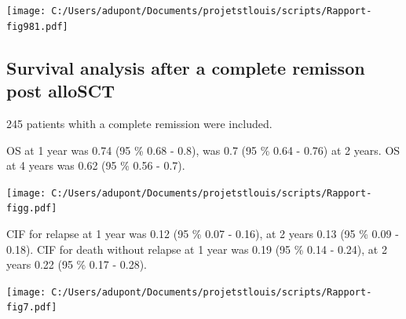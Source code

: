 \documentclass[a4paper,11pt] {article}
\begin{document}
\begin{center}
\texttt{[image: C:/Users/adupont/Documents/projetstlouis/scripts/Rapport-fig981.pdf]}

\end{center}



\pagebreak
\subsection{Survival analysis after a complete remisson post alloSCT}
245 patients whith a complete remission were included.


OS at 1 year was 0.74 (95 \% 0.68 - 0.8), was 0.7 (95 \% 0.64 - 0.76) at 2 years. OS at 4 years was 0.62 (95 \% 0.56 - 0.7).
\\
\begin{center}
\texttt{[image: C:/Users/adupont/Documents/projetstlouis/scripts/Rapport-figg.pdf]}

\pagebreak
CIF for relapse at 1 year was 0.12 (95 \% 0.07 - 0.16), at 2 years  0.13 (95 \% 0.09 - 0.18). CIF for death without relapse  at 1 year was 0.19 (95 \% 0.14 - 0.24), at 2 years  0.22 (95 \% 0.17 - 0.28). 


\begin{center}
\texttt{[image: C:/Users/adupont/Documents/projetstlouis/scripts/Rapport-fig7.pdf]}

\end{center}




\end{center}
\end{document}
